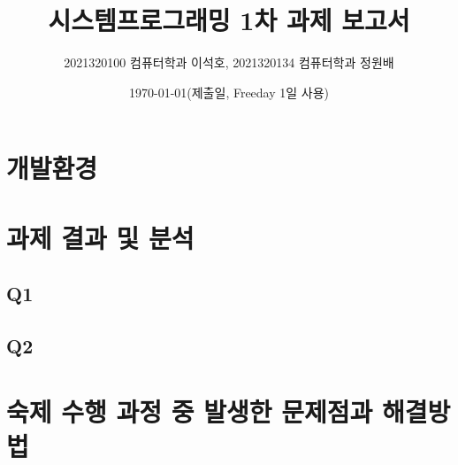 \documentclass{article}
\title{시스템프로그래밍 1차 과제 보고서}
\author{2021320100 컴퓨터학과 이석호, 2021320134 컴퓨터학과 정원배}
\date{\today (제출일, Freeday 1일 사용)}
\begin{document}
\maketitle

\tableofcontents

\clearpage

\section{개발환경}

\section{과제 결과 및 분석}

\subsection{Q1}

\subsection{Q2}

\section{숙제 수행 과정 중 발생한 문제점과 해결방법}
\end{document}
